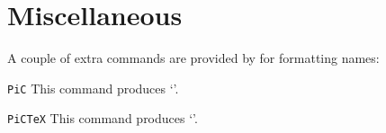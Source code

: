 \section{Miscellaneous}
A couple of extra commands are provided by \PiCTeX{} for formatting names:
\begin{syntax}
\item[\tt\bsl PiC]
This command produces `\PiC'.
\item[\tt\bsl PiCTeX]
This command produces `\PiCTeX'.
\end{syntax}




